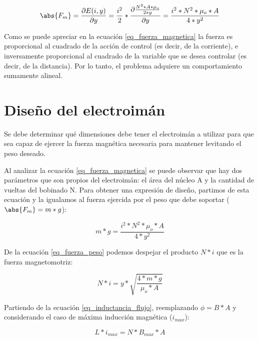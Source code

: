 \begin{equation}\label{eq_fuerza_magnetica}
	\abs{F_{m}}=\frac{\partial{E(i,y)}}{\partial{y}}=\frac{i^{2}}{2}*\frac{\partial{\frac{{N^{2}*A*\mu_{o}}}{2*y}}}{\partial{y}}=\frac{i^{2}*N^{2}*\mu_{o}*A}{4*y^{2}}
\end{equation}

Como se puede apreciar en la ecuación \ref{eq_fuerza_magnetica} la fuerza es proporcional al cuadrado de la acción de control (es decir, de la corriente), e inversamente proporcional al cuadrado de la variable que se desea controlar (es decir, de la distancia). Por lo tanto, el problema adquiere un comportamiento sumamente alineal.

\section{Diseño del electroimán}

Se debe determinar qué dimensiones debe tener el electroimán a utilizar para que sea capaz de ejercer la fuerza magnética necesaria para mantener levitando el peso deseado.

Al analizar la ecuación \ref{eq_fuerza_magnetica} se puede observar que hay dos parámetros que son propios del electroimán: el área del núcleo A y la cantidad de vueltas del bobinado N. Para obtener una expresión de diseño, partimos de esta ecuación y la igualamos al fuerza ejercida por el peso que debe soportar ($\abs{F_{m}}=m*g$):

\begin{equation}\label{eq_fuerza_peso}
	m*g=\frac{i^{2}*N^{2}*\mu_{o}*A}{4*y^{2}}
\end{equation}

De la ecuación \ref{eq_fuerza_peso} podemos despejar el producto $N*i$ que es la fuerza magnetomotriz:

\begin{equation} \label{eq_n_por_i}
	N*i=y*\sqrt{\frac{4*m*g}{\mu_{o}*A}}
\end{equation}

Partiendo de la ecuación \ref{eq_inductancia_flujo}, reemplazando $\phi=B*A$ y considerando el caso de máxima inducción magnética ($i_{max}$):

\begin{equation}\label{eq_inductancia_densidad}
	L*i_{max}=N*B_{max}*A
\end{equation}

